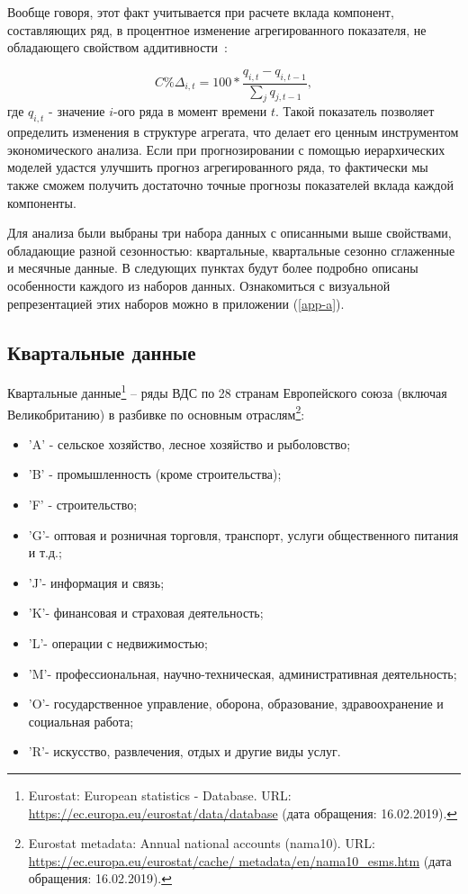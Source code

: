 \documentclass[12pt,a4paper, oneside]{extreport}
\begin{document}
Вообще говоря, этот  факт учитывается при расчете вклада компонент, составляющих ряд, в процентное изменение агрегированного показателя, не обладающего свойством аддитивности~\cite{bea3}:  

\begin{equation}\label{key}
 C\% Δ_{i,t} = 100 * \dfrac{q_{i,t}-q_{i,t-1} }{\sum_j q_{j,t-1} } ,
\end{equation}
\noindent
где $q_{i,t}$ - значение $i$-ого ряда в момент времени $t$.
Такой показатель позволяет определить изменения в структуре агрегата, что делает его ценным инструментом экономического анализа.
Если при прогнозировании с помощью иерархических моделей удастся улучшить прогноз агрегированного ряда, то фактически мы также сможем получить достаточно точные прогнозы показателей вклада каждой компоненты.

Для анализа были выбраны три набора данных с описанными выше свойствами, обладающие  разной сезонностью:  квартальные, квартальные сезонно сглаженные и месячные данные. В следующих пунктах будут более подробно   описаны особенности каждого из наборов данных. Ознакомиться с визуальной репрезентацией этих наборов можно в приложении (\ref{app-a}).


\subsection{Квартальные данные}

Квартальные данные\footnote{Eurostat: European statistics - Database. URL: \url{https://ec.europa.eu/eurostat/data/database} (дата обращения: 16.02.2019).} -- ряды ВДС по 28 странам Европейского союза (включая Великобританию) в разбивке по основным отраслям\footnote{Eurostat metadata: Annual national accounts (nama10). URL: \url{https://ec.europa.eu/eurostat/cache/
	metadata/en/nama10\_esms.htm} (дата обращения: 16.02.2019).}:

\begin{itemize}
	\item  'A' - сельское хозяйство, лесное хозяйство и рыболовство;
\item  'B' - промышленность (кроме строительства);
\item  'F' - строительство;
\item  'G'- оптовая и розничная торговля, транспорт, услуги общественного питания и т.д.;
\item  'J'- информация и связь;
\item  'K'- финансовая и страховая деятельность;
\item  'L'- операции с недвижимостью;
\item  'M'- профессиональная, научно-техническая, административная деятельность;
\item  'O'- государственное управление, оборона, образование, здравоохранение и социальная работа;
\item  'R'- искусство, развлечения, отдых и другие виды услуг. 


\end{itemize}
\end{document}
